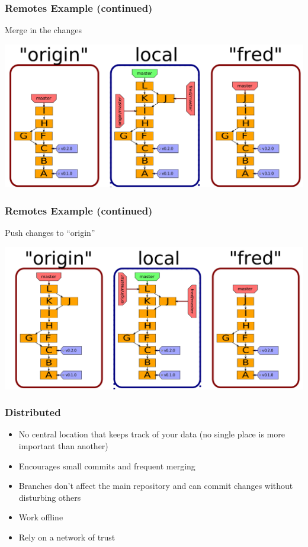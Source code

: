 \documentclass[english,compress]{beamer}
\begin{document}
\begin{frame}[fragile]
    \frametitle{Remotes Example (continued)}
	Merge in the changes

	\begin{center}
		\includegraphics[width=.8\textwidth]{figs/merge-fred}
	\end{center}
\end{frame}

\begin{frame}[fragile]
    \frametitle{Remotes Example (continued)}
	Push changes to ``origin''

	\begin{center}
		\includegraphics[width=.8\textwidth]{figs/push-fred}
	\end{center}
\end{frame}

\frame
{
    \frametitle{Distributed}
    \begin{itemize}
        \item No central location that keeps track of your data (no single place is more important than another)
        \item Encourages small commits and frequent merging
        \item Branches don't affect the main repository and can commit changes without disturbing others
        \item Work offline
        \item Rely on a network of trust
    \end{itemize}
}
\end{document}
